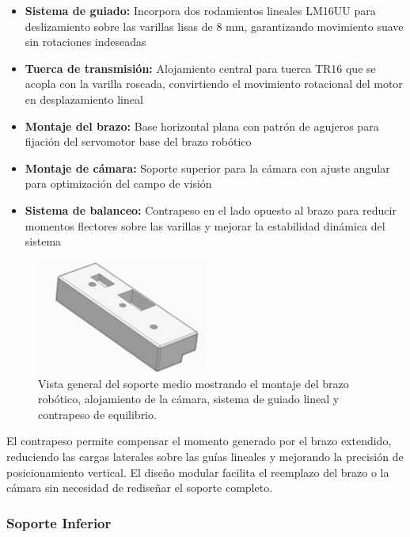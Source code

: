\begin{itemize}[label=$\bullet$]
    \item \textbf{Sistema de guiado:} Incorpora dos rodamientos lineales LM16UU para deslizamiento sobre las varillas lisas de 8 mm, garantizando movimiento suave sin rotaciones indeseadas
    \item \textbf{Tuerca de transmisión:} Alojamiento central para tuerca TR16 que se acopla con la varilla roscada, convirtiendo el movimiento rotacional del motor en desplazamiento lineal
    \item \textbf{Montaje del brazo:} Base horizontal plana con patrón de agujeros para fijación del servomotor base del brazo robótico
    \item \textbf{Montaje de cámara:} Soporte superior para la cámara con ajuste angular para optimización del campo de visión
    \item \textbf{Sistema de balanceo:} Contrapeso en el lado opuesto al brazo para reducir momentos flectores sobre las varillas y mejorar la estabilidad dinámica del sistema
\end{itemize}

\begin{figure}[H]
    \centering
    \includegraphics[width=0.5\textwidth]{img/MedioReal_simplificado_vista.jpg}
    \caption{Vista general del soporte medio mostrando el montaje del brazo robótico, alojamiento de la cámara, sistema de guiado lineal y contrapeso de equilibrio.}
    \label{fig:soporte_medio_Real}
\end{figure}

El contrapeso permite compensar el momento generado por el brazo extendido, reduciendo las cargas laterales sobre las guías lineales y mejorando la precisión de posicionamiento vertical. El diseño modular facilita el reemplazo del brazo o la cámara sin necesidad de rediseñar el soporte completo.

\subsubsection{Soporte Inferior}

